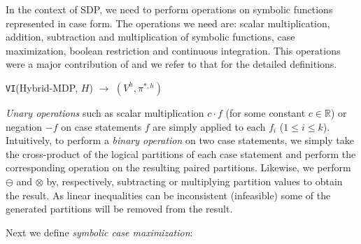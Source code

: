In the context of SDP, we need to perform operations on symbolic functions represented in case form. The operations we need are: scalar multiplication, addition, subtraction and multiplication of symbolic functions, case maximization, boolean restriction and continuous integration. This operations were a major contribution of \cite{sanner_uai11} and we refer to that for the detailed definitions. 

\incmargin{.5em}
\linesnumbered
\begin{algorithm}[th!]
\vspace{-.5mm}
\dontprintsemicolon
{}
\caption{\footnotesize \texttt{VI}(Hybrid-MDP, $H$) $\longrightarrow$ $(V^h,\pi^{*,h})$ \label{alg:vi}}
\vspace{-1mm}
\end{algorithm}
\decmargin{.5em}

\emph{Unary operations} such as scalar multiplication $c\cdot f$ (for
some constant $c \in \mathbb{R}$) or negation $-f$ on case statements
$f$ are simply applied to each
$f_i$ ($1 \leq i \leq k$). Intuitively, to perform a \emph{binary
  operation} on two case statements, we simply take the cross-product
of the logical partitions of each case statement and perform the
corresponding operation on the resulting paired partitions. 
Likewise, we perform $\ominus$ and $\otimes$ by,
respectively, subtracting or multiplying partition values to obtain the result. 
As linear inequalities can be inconsistent (infeasible) some of the generated partitions will be removed from the result. 

Next we define \emph{symbolic case maximization}:
\vspace{-2mm}


